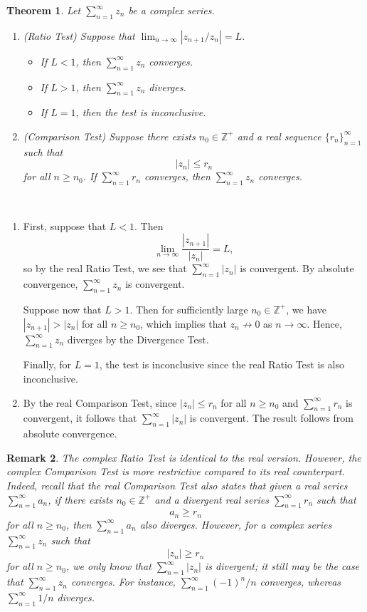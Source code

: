 \documentclass[10pt]{article}
\makeatletter
\newcommand{\Z}{\mathbb{Z}}
\theoremstyle{newstyle}
\newtheorem{thm}{Theorem}[section]
\newtheorem{remark}[thm]{Remark}
\newenvironment{pf}[1][\proofname]{\par
  \pushQED{\qed}%
  \normalfont \topsep0\p@\relax
  \trivlist
  \item[\hskip\labelsep\scshape
  #1\@addpunct{.}]\ignorespaces
}{%
  \popQED\endtrivlist\@endpefalse
}
\makeatother
\begin{document}
\begin{thm}
Let $\sum_{n=1}^\infty z_n$ be a complex series.
\begin{enumerate}[(1)]
    \item (Ratio Test) Suppose that $\lim_{n\to\infty} |z_{n+1}/z_n| = L$. 
    \begin{itemize}
        \item If $L < 1$, then $\sum_{n=1}^\infty z_n$ converges. 
        \item If $L > 1$, then $\sum_{n=1}^\infty z_n$ diverges. 
        \item If $L = 1$, then the test is inconclusive. 
    \end{itemize}
    \item (Comparison Test) Suppose there exists $n_0 \in \Z^+$ and a real sequence $\{r_n\}_{n=1}^\infty$ 
    such that 
    \[ |z_n| \leq r_n \]
    for all $n \geq n_0$. If $\sum_{n=1}^\infty r_n$ converges, then $\sum_{n=1}^\infty z_n$ converges. 
\end{enumerate}
\end{thm}
\begin{pf}~
\begin{enumerate}[(1)]
    \item First, suppose that $L < 1$. Then 
    \[ \lim_{n\to\infty} \frac{|z_{n+1}|}{|z_n|} = L, \]
    so by the real Ratio Test, we see that $\sum_{n=1}^\infty |z_n|$ is convergent. 
    By absolute convergence, $\sum_{n=1}^\infty z_n$ is convergent. 
    
    Suppose now that $L > 1$. Then for sufficiently large $n_0 \in \Z^+$, we have 
    $|z_{n+1}| > |z_n|$ for all $n \geq n_0$, which implies that 
    $z_n \nrightarrow 0$ as $n \to \infty$. Hence, $\sum_{n=1}^\infty z_n$ diverges by the 
    Divergence Test. 
    
    Finally, for $L = 1$, the test is inconclusive since the real Ratio Test is also inconclusive.
    
    \item By the real Comparison Test, since $|z_n| \leq r_n$ for all $n \geq n_0$ and 
    $\sum_{n=1}^\infty r_n$ is convergent, it follows that $\sum_{n=1}^\infty |z_n|$ is convergent.
    The result follows from absolute convergence. \qedhere 
\end{enumerate}
\end{pf}

\begin{remark}
The complex Ratio Test is identical to the real version. However, the complex Comparison Test 
is more restrictive compared to its real counterpart. Indeed, recall that the 
real Comparison Test also states that given a real series $\sum_{n=1}^\infty a_n$, if 
there exists $n_0 \in \Z^+$ and a divergent real series $\sum_{n=1}^\infty r_n$ such that 
\[ a_n \geq r_n \]
for all $n \geq n_0$, then $\sum_{n=1}^\infty a_n$ also diverges. However, for a complex series 
$\sum_{n=1}^\infty z_n$ such that 
\[ |z_n| \geq r_n \]
for all $n \geq n_0$, we only know that $\sum_{n=1}^\infty |z_n|$ is divergent; it still may be the 
case that $\sum_{n=1}^\infty z_n$ converges. For instance, $\sum_{n=1}^\infty (-1)^n/n$ 
converges, whereas $\sum_{n=1}^\infty 1/n$ diverges. 
\end{remark}
\end{document}
